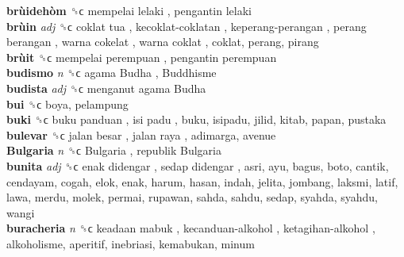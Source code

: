 \textbf{brùidehòm} ␝ϲ   mempelai lelaki ,  pengantin lelaki   \\
\textbf{brùin} \emph{adj}  ␝ϲ   coklat tua ,  kecoklat-coklatan ,  keperang-perangan ,  perang berangan ,  warna cokelat ,  warna coklat , coklat, perang, pirang  \\
\textbf{brùit} ␝ϲ   mempelai perempuan ,  pengantin perempuan   \\
\textbf{budismo} \emph{n}  ␝ϲ   agama Budha ,  Buddhisme   \\
\textbf{budista} \emph{adj}  ␝ϲ   menganut agama Budha   \\
\textbf{bui} ␝ϲ  boya, pelampung  \\
\textbf{buki} ␝ϲ   buku panduan ,  isi padu , buku, isipadu, jilid, kitab, papan, pustaka  \\
\textbf{bulevar} ␝ϲ   jalan besar ,  jalan raya , adimarga, avenue  \\
\textbf{Bulgaria} \emph{n}  ␝ϲ   Bulgaria ,  republik Bulgaria   \\
\textbf{bunita} \emph{adj}  ␝ϲ   enak didengar ,  sedap didengar , asri, ayu, bagus, boto, cantik, cendayam, cogah, elok, enak, harum, hasan, indah, jelita, jombang, laksmi, latif, lawa, merdu, molek, permai, rupawan, sahda, sahdu, sedap, syahda, syahdu, wangi  \\
\textbf{buracheria} \emph{n}  ␝ϲ   keadaan mabuk ,  kecanduan-alkohol ,  ketagihan-alkohol , alkoholisme, aperitif, inebriasi, kemabukan, minum  \\
